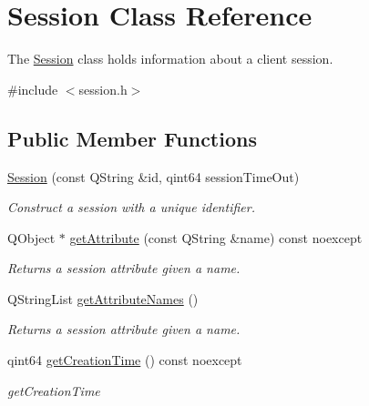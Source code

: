 \hypertarget{class_session}{}\section{Session Class Reference}
\label{class_session}


The \hyperlink{class_session}{Session} class holds information about a client session.  




{\ttfamily \#include $<$session.\+h$>$}

\subsection*{Public Member Functions}
\begin{DoxyCompactItemize}
\item 
\mbox{\label{class_session_a06554b019fe2f90aec2868ebb350c69e}} 
\hyperlink{class_session_a06554b019fe2f90aec2868ebb350c69e}{Session} (const Q\+String \&id, qint64 session\+Time\+Out)
\begin{DoxyCompactList}\small\item\em Construct a session with a unique identifier. \end{DoxyCompactList}\item 
Q\+Object $\ast$ \hyperlink{class_session_a8c4e4bd7aa6d6fb16ab3dcdb5e892783}{get\+Attribute} (const Q\+String \&name) const noexcept
\begin{DoxyCompactList}\small\item\em Returns a session attribute given a name. \end{DoxyCompactList}\item 
\mbox{\label{class_session_a1ca0e9626f0b14957436f9e36cb1b65b}} 
Q\+String\+List \hyperlink{class_session_a1ca0e9626f0b14957436f9e36cb1b65b}{get\+Attribute\+Names} ()
\begin{DoxyCompactList}\small\item\em Returns a session attribute given a name. \end{DoxyCompactList}\item 
\mbox{\label{class_session_a30db82e0a4a27644eafba17b45a648e6}} 
qint64 \hyperlink{class_session_a30db82e0a4a27644eafba17b45a648e6}{get\+Creation\+Time} () const noexcept
\begin{DoxyCompactList}\small\item\em get\+Creation\+Time \end{DoxyCompactList}\item 

\end{DoxyCompactItemize}
